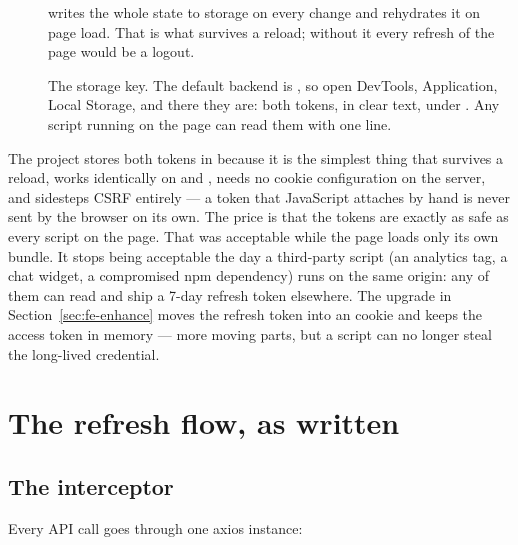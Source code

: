 \begin{description}
  \item[]  writes the whole state to storage on
  every change and rehydrates it on page load. That is what survives a
  reload; without it every refresh of the page would be a logout.
  \item[] The storage key. The default backend is
  , so open DevTools, Application, Local Storage,
  and there they are: both tokens, in clear text, under
  . Any script running on the page can read them
  with one line.
\end{description}

\begin{decision}
The project stores both tokens in  because it is the
simplest thing that survives a reload, works identically on
 and , needs no cookie
configuration on the server, and sidesteps CSRF entirely --- a token
that JavaScript attaches by hand is never sent by the browser on its
own. The price is that the tokens are exactly as safe as every script
on the page. That was acceptable while the page loads only its own
bundle. It stops being acceptable the day a third-party script (an
analytics tag, a chat widget, a compromised npm dependency) runs on the
same origin: any of them can read  and ship a 7-day
refresh token elsewhere. The upgrade in Section~\ref{sec:fe-enhance}
moves the refresh token into an  cookie and keeps the
access token in memory --- more moving parts, but a script can no
longer steal the long-lived credential.
\end{decision}

\section{The refresh flow, as written}

\subsection{The interceptor}

Every API call goes through one axios instance:

